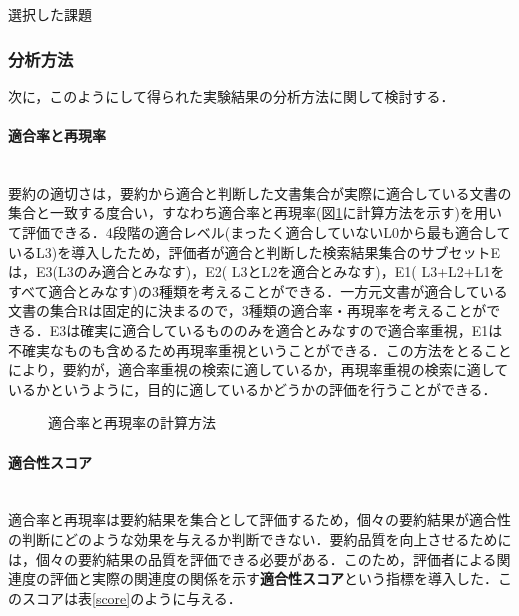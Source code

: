 \begin{table}[hbtp]
  \begin{center}
    \caption{選択した課題}
    \label{kadai}
  \end{center}
\end{table}


\subsubsection{分析方法}
次に，このようにして得られた実験結果の分析方法に関して検討する．

\paragraph{適合率と再現率} ~ \\
\indent
要約の適切さは，要約から適合と判断した文書集合が実際に適合している文書の集合と一致する度合い，すなわち適合率と再現率(図\ref{howtocalc}に計算方法を示す)を用いて評価できる．4段階の適合レベル(まったく適合していないL0から最も適合しているL3)を導入したため，評価者が適合と判断した検索結果集合のサブセットEは，E3(L3のみ適合とみなす)，E2( L3とL2を適合とみなす)，E1( L3+L2+L1をすべて適合とみなす)の3種類を考えることができる．一方元文書が適合している文書の集合Rは固定的に決まるので，3種類の適合率・再現率を考えることができる．E3は確実に適合しているもののみを適合とみなすので適合率重視，E1は不確実なものも含めるため再現率重視ということができる．この方法をとることにより，要約が，適合率重視の検索に適しているか，再現率重視の検索に適しているかというように，目的に適しているかどうかの評価を行うことができる．

\begin{figure}[htbp]
  \begin{center}
    \caption{適合率と再現率の計算方法}
    \label{howtocalc}
  \end{center}
\end{figure}

\paragraph{適合性スコア} ~ \\
\indent
適合率と再現率は要約結果を集合として評価するため，個々の要約結果が適合性の判断にどのような効果を与えるか判断できない．要約品質を向上させるためには，個々の要約結果の品質を評価できる必要がある．このため，評価者による関連度の評価と実際の関連度の関係を示す{\bf 適合性スコア}という指標を導入した．このスコアは表\ref{score}のように与える．


